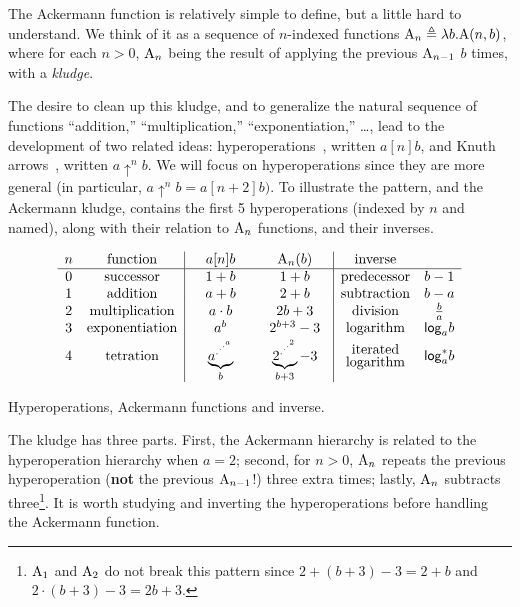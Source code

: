 The Ackermann function is relatively simple to define, but a little hard to understand.  We think of it as a sequence of $n$-indexed functions $\text{A}_n \triangleq \lambda b.\text{A}(n,b)$, where for each $n>0$, $\text{A}_n$ being the result of applying the previous $\text{A}_{n-1}$ $b$ times, with a \emph{kludge}.

The desire to clean up this kludge, and to generalize the natural sequence
of functions ``addition,'' ``multiplication,'' ``exponentiation,'' \ldots,
lead to the development of two related ideas: hyperoperations~\cite{blah},
written $a [n] b$, and Knuth arrows~\cite{blah}, written $a \uparrow^n b$.
We will focus on hyperoperations since they are more general
(in particular, $a \uparrow^n b = a[n+2]b)$.
To illustrate the pattern, and the Ackermann kludge,  contains the first 5 hyperoperations (indexed by $n$ and named), along with their relation to $\text{A}_n$ functions, and their inverses.
\begin{table}[h]
	\[
\begin{array}{cc|cc|cc}
n & \text{function} & \quad a [n] b \quad & \quad \Ack_n(b) \quad & \text{inverse} \\
\hline
0 & \text{successor} & 1 + b & 1 + b & \text{predecessor} & b - 1 \\
1 & \text{addition} & a + b & 2 + b & \text{subtraction} & b - a \\
2 & \text{multiplication} & a \cdot b & 2b + 3 & \text{division} & \frac{b}{a}\\
3 & \text{exponentiation} & a^b & 2^{b + 3} - 3 & \text{logarithm} & \mathsf{log}_a b \\
[2pt]
4 & \text{tetration} & \underbrace{a^{.^{.^{.^a}}}}_b & \underbrace{2^{.^{.^{.^2}}}}_{b+3} - 3 & \begin{array}{@{}c@{}}\text{iterated}\\[-3pt]\text{logarithm}\end{array} & \mathsf{log}^*_a b
\end{array}
\] \caption{Hyperoperations, Ackermann functions and inverse.}
\label{table: hyperop-ack-inv}
\end{table}

The kludge has three parts.  First, the Ackermann hierarchy is related to the hyperoperation hierarchy when $a=2$; second, for $n>0$, $\text{A}_n$ repeats the previous hyperoperation (\textbf{not} the previous $\text{A}_{n-1}$!) three extra times; lastly, $\text{A}_n$ subtracts three\footnote{$\text{A}_{1}$ and $\text{A}_{2}$ do not break this pattern since $2 + (b + 3) - 3 = 2 + b$ and $2 \cdot (b + 3) - 3 = 2b + 3$.}.
It is worth studying and inverting the hyperoperations before handling the Ackermann function.

